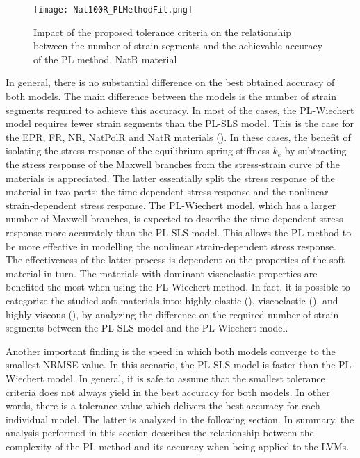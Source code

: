 \begin{figure}[H]
	\centering
	\texttt{[image: Nat100R\_PLMethodFit.png]}
	\caption{Impact of the proposed tolerance criteria on the relationship between the number of strain segments and the achievable accuracy of the PL method. NatR material}
	\label{fig:SegmentsNat100R}
\end{figure}

In general, there is no substantial difference on the best obtained accuracy of both models. The main difference between the models is the number of strain segments required to achieve this accuracy. In most of the cases, the PL-Wiechert model requires fewer strain segments than the PL-SLS model. This is the case for the EPR, FR, NR, NatPolR and NatR materials (). In these cases, the benefit of isolating the stress response of the equilibrium spring stiffness $k_e$ by subtracting the stress response of the Maxwell branches from the stress-strain curve of the materials is appreciated. The latter essentially split the stress response of the material in two parts: the time dependent stress response and the nonlinear strain-dependent stress response. The PL-Wiechert model, which has a larger number of Maxwell branches, is expected to describe the time dependent stress response more accurately than the PL-SLS model. This allows the PL method to be more effective in modelling the nonlinear strain-dependent stress response. The effectiveness of the latter process is dependent on the properties of the soft material in turn. The materials with dominant viscoelastic properties are benefited the most when using the PL-Wiechert method. In fact, it is possible to categorize the studied soft materials into: highly elastic (), viscoelastic (), and highly viscous (), by analyzing the difference on the required number of strain segments between the PL-SLS model and the PL-Wiechert model.

Another important finding is the speed in which both models converge to the smallest NRMSE value. In this scenario, the PL-SLS model is faster than the PL-Wiechert model. In general, it is safe to assume that the smallest tolerance criteria does not always yield in the best accuracy for both models. In other words, there is a tolerance value which delivers the best accuracy for each individual model. The latter is analyzed in the following section. In summary, the analysis performed in this section describes the relationship between the complexity of the PL method and its accuracy when being applied to the LVMs. 



